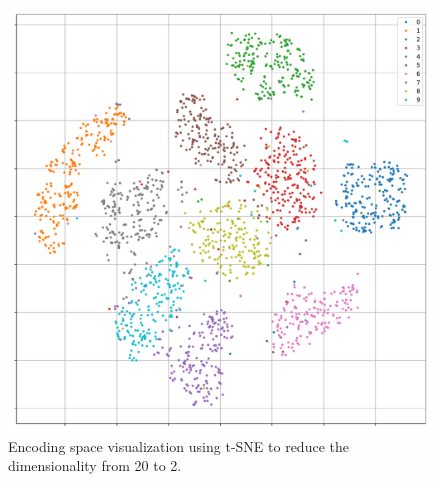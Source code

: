 \documentclass[a4paper,11pt]{article}
\begin{document}
\begin{figure}[htp]
  \centering
  \caption{Encoding space visualization using t-SNE to reduce the dimensionality from 20 to 2.}
  \label{fig:tsne}
  \includegraphics[scale=.5]{../encoded_space.pdf}
\end{figure}
\end{document}
